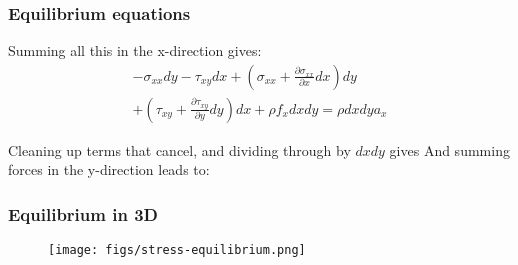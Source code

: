 \documentclass[handout]{beamer}
\begin{document}
\begin{frame}
\frametitle{Equilibrium equations}
Summing all this in the x-direction gives:
	\begin{multline*}
	-\sigma_{xx}dy - \tau_{xy}dx + %
	\left( \sigma_{xx} + \frac{\partial \sigma_{xx}}{\partial x} dx \right) dy \\%
	+ \left( \tau_{xy} + \frac{\partial \tau_{xy}}{\partial y} dy \right) dx + \rho f_x dx dy = %
	\rho dx dy a_x	
	\end{multline*}

Cleaning up terms that cancel, and dividing through by \(dx dy\) gives
	And summing forces in the y-direction leads to:
\end{frame}

\begin{frame}
\frametitle{Equilibrium in 3D}
 	\begin{figure}
		\texttt{[image: figs/stress-equilibrium.png]}
	\end{figure}
\end{frame}
\end{document}
